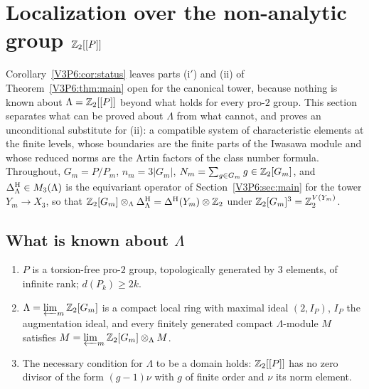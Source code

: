 \section{Localization over the non-analytic group \texorpdfstring{$\mathbb{Z}_2[[P]]$}{Z2[[P]]}}\label{V3P6:sec:pro2}

Corollary~\ref{V3P6:cor:status} leaves parts (i$'$) and (ii) of Theorem~\ref{V3P6:thm:main} open
for the canonical tower, because nothing is known about $\Lambda=\mathbb{Z}_2[[P]]$ beyond what holds for
every pro-$2$ group. This section separates what can be proved about $\Lambda$ from what cannot,
and proves an unconditional substitute for (ii): a compatible system of characteristic elements
at the finite levels, whose boundaries are the finite parts of the Iwasawa module and whose
reduced norms are the Artin factors of the class number formula. Throughout, $G_m=P/P_m$,
$n_m=3|G_m|$, $N_m=\sum_{g\in G_m}g\in\mathbb{Z}_2[G_m]$, and $\Delta^{\mathrm{H}}_\Lambda\in M_3(\Lambda)$ is the
equivariant operator of Section~\ref{V3P6:sec:main} for the tower $Y_m\to X_3$, so that
$\mathbb{Z}_2[G_m]\otimes_\Lambda\Delta^{\mathrm{H}}_\Lambda=\Delta^{\mathrm{H}}(Y_m)\otimes\mathbb{Z}_2$ under
$\mathbb{Z}_2[G_m]^{3}=\mathbb{Z}_2^{V(Y_m)}$.

\subsection*{What is known about \texorpdfstring{$\Lambda$}{Lambda}}

\begin{proposition}\label{V3P6:prop:pro2basic}
\begin{enumerate}
\item[(i)] $P$ is a torsion-free pro-$2$ group, topologically generated by $3$ elements, of
infinite rank; $d(P_k)\ge2k$.
\item[(ii)] $\Lambda=\varprojlim_m\mathbb{Z}_2[G_m]$ is a compact local ring with maximal ideal
$(2,I_P)$, $I_P$ the augmentation ideal, and every finitely generated compact
$\Lambda$-module $M$ satisfies $M=\varprojlim_m\mathbb{Z}_2[G_m]\otimes_\Lambda M$.
\item[(iii)] The necessary condition for $\Lambda$ to be a domain holds: $\mathbb{Z}_2[[P]]$ has no
zero divisor of the form $(g-1)\nu$ with $g$ of finite order and $\nu$ its norm element.
\end{enumerate}
\end{proposition}

